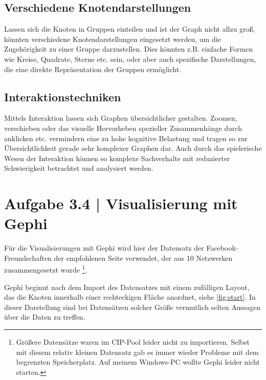 \documentclass[a4paper,12pt,ngerman]{scrartcl}
\begin{document}
\subsection*{Verschiedene Knotendarstellungen}
Lassen sich die Knoten in Gruppen einteilen und ist der Graph nicht allzu groß, könnten verschiedene Knotendarstellungen eingesetzt werden, um die Zugehörigkeit zu einer Gruppe darzustellen. Dies könnten z.B. einfache Formen wie Kreise, Quadrate, Sterne etc. sein, oder aber auch spezifische Darstellungen, die eine direkte Repräsentation der Gruppen ermöglicht.

\subsection*{Interaktionstechniken}
Mittels Interaktion lassen sich Graphen übersichtlicher gestalten. Zoomen, verschieben oder das visuelle Hervorheben spezieller Zusammenhänge durch anklicken etc. vermindern eine zu hohe kognitive Belastung und tragen so zur Übersichtlichkeit gerade sehr komplexer Graphen dar. Auch durch das spielerische Wesen der Interaktion können so komplexe Sachverhalte mit reduzierter Schwierigkeit betrachtet und analysiert werden.

\section{Aufgabe 3.4 | Visualisierung mit Gephi}

%

Für die Visualisierungen mit Gephi wird hier der Datensatz der Facebook-Freundschaften der empfohlenen Seite verwendet, der aus 10 Netzwerken zusammengesetzt wurde \footnote{Größere Datensätze waren im CIP-Pool leider nicht zu importieren. Selbst mit diesem relativ kleinen Datensatz gab es immer wieder Probleme mit dem begrenzten Speicherplatz. Auf meinem Windows-PC wollte Gephi leider nicht starten.}.

Gephi beginnt nach dem Import des Datensatzes mit einem zufälligen Layout, das die Knoten innerhalb einer rechteckigen Fläche anordnet, siehe \cref{fig:start}. In dieser Darstellung sind bei Datensätzen solcher Größe vermutlich selten Aussagen über die Daten zu treffen.
\end{document}
